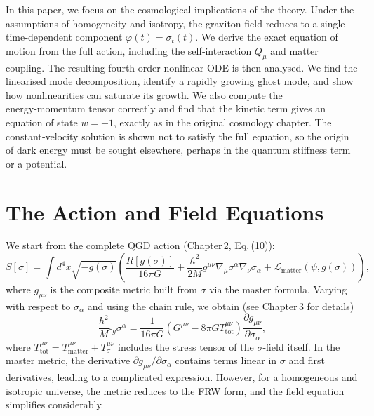 \documentclass[11pt,a4paper]{article}
\begin{document}
In this paper, we focus on the cosmological implications of the theory. Under the assumptions of homogeneity and isotropy, the graviton field reduces to a single time‑dependent component \(\varphi(t) = \sigma_t(t)\). We derive the exact equation of motion from the full action, including the self‑interaction \(Q_\mu\) and matter coupling. The resulting fourth‑order nonlinear ODE is then analysed. We find the linearised mode decomposition, identify a rapidly growing ghost mode, and show how nonlinearities can saturate its growth. We also compute the energy‑momentum tensor correctly and find that the kinetic term gives an equation of state \(w=-1\), exactly as in the original cosmology chapter. The constant‑velocity solution is shown not to satisfy the full equation, so the origin of dark energy must be sought elsewhere, perhaps in the quantum stiffness term or a potential.

\section{The Action and Field Equations}
\label{sec:action}

We start from the complete QGD action (Chapter 2, Eq. (10)):
\begin{equation}
S[\sigma] = \int d^4x \sqrt{-g(\sigma)} \left( \frac{R[g(\sigma)]}{16\pi G} + \frac{\hbar^2}{2M} g^{\mu\nu} \nabla_\mu \sigma^\alpha \nabla_\nu \sigma_\alpha + \mathcal{L}_{\mathrm{matter}}(\psi, g(\sigma)) \right),
\label{eq:action}
\end{equation}
where \(g_{\mu\nu}\) is the composite metric built from \(\sigma\) via the master formula. Varying with respect to \(\sigma_\alpha\) and using the chain rule, we obtain (see Chapter 3 for details)
\begin{equation}
\frac{\hbar^2}{M} \square_g \sigma^\alpha = \frac{1}{16\pi G} \left( G^{\mu\nu} - 8\pi G T_{\mathrm{tot}}^{\mu\nu} \right) \frac{\partial g_{\mu\nu}}{\partial \sigma_\alpha},
\label{eq:field}
\end{equation}
where \(T_{\mathrm{tot}}^{\mu\nu} = T_{\mathrm{matter}}^{\mu\nu} + T_\sigma^{\mu\nu}\) includes the stress tensor of the \(\sigma\)-field itself. In the master metric, the derivative \(\partial g_{\mu\nu}/\partial \sigma_\alpha\) contains terms linear in \(\sigma\) and first derivatives, leading to a complicated expression. However, for a homogeneous and isotropic universe, the metric reduces to the FRW form, and the field equation simplifies considerably.
\end{document}
